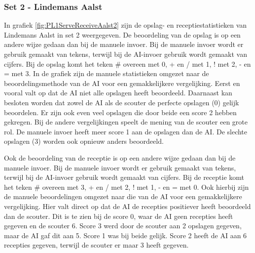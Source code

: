 \subsubsection{Set 2 - Lindemans Aalst}
\label{sec:PL1_Aalst2}
In grafiek \ref{fig:PL1ServeReceiveAalst2} zijn de opslag- en receptiestatistieken van Lindemans Aalst in set 2 weergegeven. De beoordeling van de opslag is op een andere wijze gedaan dan bij de manuele invoer. Bij de manuele invoer wordt er gebruik gemaakt van tekens, terwijl bij de AI-invoer gebruik wordt gemaakt van cijfers. Bij de opslag komt het teken \# overeen met 0, + en / met 1, ! met 2, - en = met 3. In de grafiek zijn de manuele statistieken omgezet naar de beoordelingsmethode van de AI voor een gemakkelijkere vergelijking. 
Eerst en vooral valt op dat de AI niet alle opslagen heeft beoordeeld. Daarnaast kan besloten worden dat zowel de AI als de scouter de perfecte opslagen (0) gelijk beoordelen. Er zijn ook even veel opslagen die door beide een score 2 hebben gekregen. Bij de andere vergelijkingen speelt de mening van de scouter een grote rol. De manuele invoer heeft meer score 1 aan de opslagen dan de AI. De slechte opslagen (3) worden ook opnieuw anders beoordeeld.

Ook de beoordeling van de receptie is op een andere wijze gedaan dan bij de manuele invoer. Bij de manuele invoer wordt er gebruik gemaakt van tekens, terwijl bij de AI-invoer gebruik wordt gemaakt van cijfers. Bij de receptie komt het teken \# overeen met 3, + en / met 2, ! met 1, - en = met 0. Ook hierbij zijn de manuele beoordelingen omgezet naar die van de AI voor een gemakkelijkere vergelijking. Hier valt direct op dat de AI de recepties positiever heeft beoordeeld dan de scouter. Dit is te zien bij de score 0, waar de AI geen recepties heeft gegeven en de scouter 6. Score 3 werd door de scouter aan 2 opslagen gegeven, maar de AI gaf dit aan 5. Score 1 was bij beide gelijk. Score 2 heeft de AI aan 6 recepties gegeven, terwijl de scouter er maar 3 heeft gegeven.

